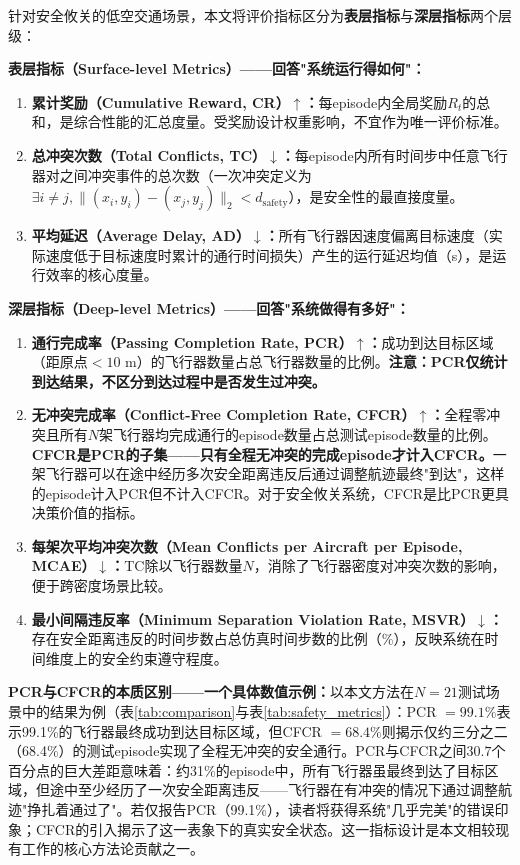 \documentclass[12pt,a4paper,UTF8]{ctexart}
\begin{document}
针对安全攸关的低空交通场景，本文将评价指标区分为\textbf{表层指标}与\textbf{深层指标}两个层级：

\textbf{表层指标（Surface-level Metrics）——回答"系统运行得如何"：}
\begin{enumerate}[label=(\arabic*)]
    \item \textbf{累计奖励（Cumulative Reward, CR）$\uparrow$：}每episode内全局奖励$R_t$的总和，是综合性能的汇总度量。受奖励设计权重影响，不宜作为唯一评价标准。
    \item \textbf{总冲突次数（Total Conflicts, TC）$\downarrow$：}每episode内所有时间步中任意飞行器对之间冲突事件的总次数（一次冲突定义为$\exists i \neq j, \|(x_i, y_i) - (x_j, y_j)\|_2 < d_{\text{safety}}$），是安全性的最直接度量。
    \item \textbf{平均延迟（Average Delay, AD）$\downarrow$：}所有飞行器因速度偏离目标速度（实际速度低于目标速度时累计的通行时间损失）产生的运行延迟均值（s），是运行效率的核心度量。
\end{enumerate}

\textbf{深层指标（Deep-level Metrics）——回答"系统做得有多好"：}
\begin{enumerate}[label=(\arabic*), resume]
    \item \textbf{通行完成率（Passing Completion Rate, PCR）$\uparrow$：}成功到达目标区域（距原点$<10$ m）的飞行器数量占总飞行器数量的比例。\textbf{注意：PCR仅统计到达结果，不区分到达过程中是否发生过冲突。}
    \item \textbf{无冲突完成率（Conflict-Free Completion Rate, CFCR）$\uparrow$：}全程零冲突且所有$N$架飞行器均完成通行的episode数量占总测试episode数量的比例。\textbf{CFCR是PCR的子集——只有全程无冲突的完成episode才计入CFCR。}一架飞行器可以在途中经历多次安全距离违反后通过调整航迹最终"到达"，这样的episode计入PCR但不计入CFCR。对于安全攸关系统，CFCR是比PCR更具决策价值的指标。
    \item \textbf{每架次平均冲突次数（Mean Conflicts per Aircraft per Episode, MCAE）$\downarrow$：}TC除以飞行器数量$N$，消除了飞行器密度对冲突次数的影响，便于跨密度场景比较。
    \item \textbf{最小间隔违反率（Minimum Separation Violation Rate, MSVR）$\downarrow$：}存在安全距离违反的时间步数占总仿真时间步数的比例（\%），反映系统在时间维度上的安全约束遵守程度。
\end{enumerate}

\textbf{PCR与CFCR的本质区别——一个具体数值示例：}以本文方法在$N=21$测试场景中的结果为例（表\ref{tab:comparison}与表\ref{tab:safety_metrics}）：PCR $= 99.1\%$表示99.1\%的飞行器最终成功到达目标区域，但CFCR $= 68.4\%$则揭示仅约三分之二（68.4\%）的测试episode实现了全程无冲突的安全通行。PCR与CFCR之间$30.7$个百分点的巨大差距意味着：约31\%的episode中，所有飞行器虽最终到达了目标区域，但途中至少经历了一次安全距离违反——飞行器在有冲突的情况下通过调整航迹"挣扎着通过了"。若仅报告PCR（99.1\%），读者将获得系统"几乎完美"的错误印象；CFCR的引入揭示了这一表象下的真实安全状态。这一指标设计是本文相较现有工作的核心方法论贡献之一。
\end{document}
